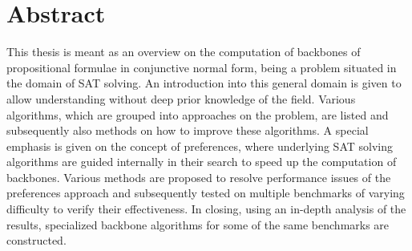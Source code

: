 \chapter*{Abstract}
This thesis is meant as an overview on the computation of backbones of propositional formulae in conjunctive normal form, being a problem situated in the domain of SAT solving. An introduction into this general domain is given to allow understanding without deep prior knowledge of the field. Various algorithms, which are grouped into approaches on the problem, are listed and subsequently also methods on how to improve these algorithms. A special emphasis is given on the concept of preferences, where underlying SAT solving algorithms are guided internally in their search to speed up the computation of backbones. Various methods are proposed to resolve performance issues of the preferences approach and subsequently tested on multiple benchmarks of varying difficulty to verify their effectiveness. In closing, using an in-depth analysis of the results, specialized backbone algorithms for some of the same benchmarks are constructed.